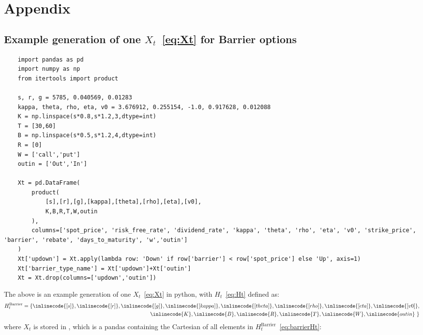 \appendix
\section{Appendix}
\subsection{Example generation of one $X_{t}$~\eqref{eq:Xt} for Barrier options}
\begin{lstlisting}
	import pandas as pd
	import numpy as np
	from itertools import product
	
	s, r, g = 5785, 0.040569, 0.01283
	kappa, theta, rho, eta, v0 = 3.676912, 0.255154, -1.0, 0.917628, 0.012088
	K = np.linspace(s*0.8,s*1.2,3,dtype=int)
	T = [30,60]
	B = np.linspace(s*0.5,s*1.2,4,dtype=int)
	R = [0]
	W = ['call','put']
	outin = ['Out','In']
	
	Xt = pd.DataFrame(
		product(
			[s],[r],[g],[kappa],[theta],[rho],[eta],[v0],
			K,B,R,T,W,outin
		),
		columns=['spot_price', 'risk_free_rate', 'dividend_rate', 'kappa', 'theta', 'rho', 'eta', 'v0', 'strike_price', 'barrier', 'rebate', 'days_to_maturity', 'w','outin']
	)
	Xt['updown'] = Xt.apply(lambda row: 'Down' if row['barrier'] < row['spot_price'] else 'Up', axis=1)
	Xt['barrier_type_name'] = Xt['updown']+Xt['outin']
	Xt = Xt.drop(columns=['updown','outin'])
\end{lstlisting}
The above is an example generation of one $X_{t}$~\eqref{eq:Xt} in python, with $H_{t}$~\eqref{eq:Ht} defined as:
\begin{equation}
	\begin{aligned}
	H_{t}^{\text{Barrier}} = \{ \inlinecode{[s]}, \inlinecode{[r]}, \inlinecode{[g]}, \inlinecode{[kappa]}, \inlinecode{[theta]}, \inlinecode{[rho]}, \inlinecode{[eta]}, \inlinecode{[v0]}, \\ \inlinecode{K},  \inlinecode{B}, \inlinecode{R}, \inlinecode{T}, \inlinecode{W}, \inlinecode{outin}\ \}
	\label{eq:barrierHt}
	\end{aligned}
\end{equation}
where $X_{t}$ is stored in , which is a pandas  containing the Cartesian  of all elements in $H_{t}^{\text{Barrier}}$~\eqref{eq:barrierHt}: \\
